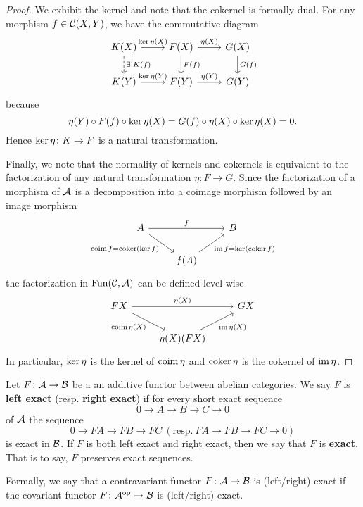 \documentclass[reqno, 12pt]{amsart}
\begin{document}
\begin{proof}
  We exhibit the kernel and note that the cokernel is formally dual.
  For any morphism $f \in \mathcal{C}(X,Y)$, we have the commutative diagram
  $$\begin{tikzcd}
    K(X) \arrow{r}{\op{ker} \eta(X)}\arrow[dashed]{d}{\exists !K(f)} & F(X) \arrow{r}{\eta(X)}\arrow{d}{F(f)} & G(X)\arrow{d}{G(f)}\\
    K(Y) \arrow{r}{\op{ker} \eta(Y)} & F(Y) \arrow{r}{\eta(Y)} & G(Y)
  \end{tikzcd}$$
  because
  $$\eta(Y) \circ F(f) \circ \operatorname{ker} \eta(X) = G(f) \circ \eta(X) \circ \operatorname{ker} \eta(X) = 0.$$
  Hence $\operatorname{ker} \eta \colon K \to F$ is a natural transformation.

  Finally, we note that the normality of kernels and cokernels is equivalent to the factorization of any natural transformation $\eta \colon F \to G$.
  Since the factorization of a morphism of $\mathcal{A}$ is a decomposition into a coimage morphism followed by an image morphism
  $$\begin{tikzcd}
    A \arrow{rr}{f}\arrow[swap]{rd}{\op{coim} f = \op{coker}(\op{ker}f)} && B\\
    & f(A) \arrow[swap]{ur}{\op{im} f = \op{ker}(\op{coker} f)}
  \end{tikzcd}$$
  the factorization in $\operatorname{Fun}(\mathcal{C},\mathcal{A})$ can be defined level-wise
  $$\begin{tikzcd}
    FX \arrow{rr}{\eta(X)} \arrow[swap]{rd}{\op{coim} \eta(X)} && GX\\
    & \eta(X)(FX) \arrow[swap]{ur}{\op{im} \eta(X)}
  \end{tikzcd}$$
  In particular, $\operatorname{ker} \eta$ is the kernel of $\operatorname{coim} \eta$ and $\operatorname{coker} \eta$ is the cokernel of $\operatorname{im} \eta$.
\end{proof}

\begin{definition}
  Let $F \colon \mathcal{A} \to \mathcal{B}$ be a an additive functor between abelian categories.
  We say $F$ is \textbf{left exact} (resp. \textbf{right exact}) if for every short exact sequence
  $$0 \to A \to B \to C \to 0$$
  of $\mathcal{A}$ the sequence
  $$0 \to FA \to FB \to FC\ (\text{resp.}\ FA \to FB \to FC \to 0)$$
  is exact in $\mathcal{B}$.
  If $F$ is both left exact and right exact, then we say that $F$ is \textbf{exact}.
  That is to say, $F$ preserves exact sequences.

  Formally, we say that a contravariant functor $F \colon \mathcal{A} \to \mathcal{B}$ is (left/right) exact if the covariant functor $F \colon \mathcal{A}^{\operatorname{op}} \to \mathcal{B}$ is (left/right) exact.
\end{definition}
\end{document}
